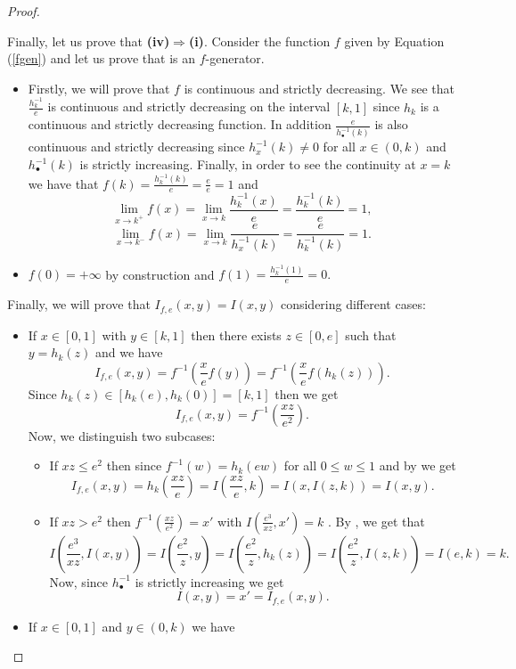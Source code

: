 \begin{proof}
\begin{itemize}
	\end{itemize}
	Finally, let us prove that {\bf (iv)$\Rightarrow$(i)}. Consider the function $f$ given by Equation (\ref{fgen}) and let us prove that is an $f$-generator.
	\begin{itemize}
		\item Firstly, we will prove that $f$ is continuous and strictly decreasing. We see that $\frac{h_k^{-1}}{e}$ is continuous and strictly decreasing on the interval $[k,1]$ since $h_k$ is a continuous and strictly decreasing function. In addition $\frac{e}{h_{\bullet}^{-1}(k)}$ is also continuous and strictly decreasing since $h_x^{-1}(k) \not = 0$ for all $x \in (0,k)$ and $h_{\bullet}^{-1}(k)$ is strictly increasing. Finally, in order to see the continuity at $x=k$ we have that $ f(k)=\frac{h_k^{-1}(k)}{e}=\frac{e}{e}=1$ and
		$$\lim_{x \to k^{+}}f(x)=\lim_{x \to k } \frac{h_k^{-1}(x)}{e}= \frac{h_k^{-1}(k)}{e}=1,$$
		$$\lim_{x \to k^{-}}f(x)=\lim_{x \to k } \frac{e}{h_x^{-1}(k)}= \frac{e}{h_k^{-1}(k)}=1.$$
		\item $f(0)=+\infty$ by construction and $f(1)=\frac{h_k^{-1}(1)}{e}=0.$
	\end{itemize}
	Finally, we will prove that $I_{f,e}(x,y)=I(x,y)$ considering different cases:
	\begin{itemize}
		\item If $x \in [0,1]$ with $y \in [k,1]$ then there exists $z \in [0,e]$ such that $y=h_k(z)$ and we have
		$$I_{f,e}(x,y)=f^{-1}\left(\frac{x}{e}f(y)\right) = f^{-1} \left(\frac{x}{e}f(h_k(z))\right).$$
		Since $h_k(z) \in [h_k(e),h_k(0)]=[k,1]$ then we get
		$$I_{f,e}(x,y)=f^{-1}\left(\frac{xz}{e^2}\right).$$
		Now, we distinguish two subcases:
		\begin{itemize}
			\item If $xz \leq e^2$ then since $f^{-1}(w)=h_k(ew)$ for all $0 \leq w \leq 1$ and by \LIey we get
			$$ I_{f,e}(x,y) =h_k\left(\frac{xz}{e}\right) = I\left( \frac{xz}{e},k \right) = I(x,I(z,k))=I(x,y).$$
			\item If $xz > e^2$ then $f^{-1}\left(\frac{xz}{e^2}\right)=x'$ with $I\left(\frac{e^3}{xz},x'\right)=k$ . By \LIex, we get that
			$$I\left(\frac{e^3}{xz},I(x,y)\right)=I\left(\frac{e^2}{z},y\right) = I \left(\frac{e^2}{z},h_k(z)\right) = I\left(\frac{e^2}{z},I(z,k)\right)=I(e,k)=k.$$
			Now, since $h_{\bullet}^{-1}$ is strictly increasing we get
			$$I(x,y)=x'=I_{f,e}(x,y).$$
		\end{itemize}
		\item If $x \in [0,1]$ and $ y \in (0,k)$ we have

\end{itemize}
\end{proof}
